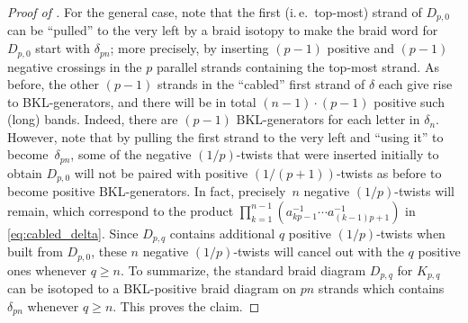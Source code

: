 \documentclass{amsart}
\theoremstyle{definition}
\theoremstyle{remark}
\theoremstyle{plain}
\newtheorem{question}[definition]{Question}%
\newcommand{\ie}{i.\,e.~}
\begin{document}
\begin{proof}[{Proof of }]
    For the general case, note that the first (\ie top-most) strand of $D_{p,0}$ can be ``pulled'' to the very left by a braid isotopy to make the braid word for $D_{p,0}$ start with $\delta_{pn}$; more precisely, by inserting $(p-1)$ positive and $(p-1)$ negative crossings in the $p$ parallel strands containing the top-most strand. As before, the other $(p-1)$ strands in the ``cabled'' first strand of $\delta$ each give rise to BKL-generators, and there will be in total $(n-1)\cdot (p-1)$ positive such (long) bands. Indeed, there are $(p-1)$ BKL-generators for each letter in $\delta_n$. However, note that by pulling the first strand to the very left and ``using it'' to become~$\delta_{pn}$, some of the negative $(1/p)$-twists that were inserted initially to obtain $D_{p,0}$ will not be paired with positive $(1/(p+1))$-twists as before to become positive BKL-generators. In fact, precisely~$n$ negative $(1/p)$-twists will remain, which correspond to the product $\prod_{k=1}^{n-1} \left(a_{kp-1}^{-1} \cdots a_{(k-1)p+1}^{-1} \right)$ in \eqref{eq:cabled_delta}. Since $D_{p,q}$ contains additional $q$ positive $(1/p)$-twists when built from $D_{p,0}$, these $n$ negative $(1/p)$-twists will cancel out with the $q$ positive ones whenever $q \geq n$. To summarize, the standard braid diagram $D_{p,q}$ for $K_{p,q}$ can be isotoped to a BKL-positive braid diagram on $pn$ strands which contains~$\delta_{pn}$ whenever $q \geq n$. This proves the claim.
\end{proof}


\end{document}
